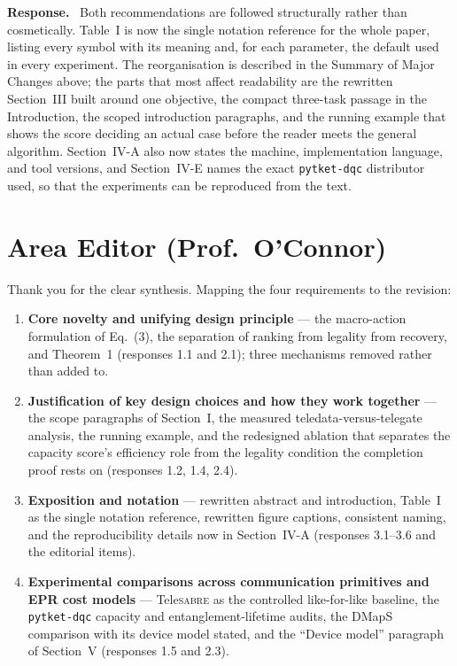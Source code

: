 \documentclass[11pt]{article}
\newcommand{\TeleSABRE}{Tele\textsc{sabre}}
\newcommand{\response}{\smallskip\noindent\textbf{Response.}\ }
\begin{document}
\response
Both recommendations are followed structurally rather than cosmetically.
Table~I is now the single notation reference for the whole paper, listing every
symbol with its meaning and, for each parameter, the default used in every
experiment. The reorganisation is described in the Summary of Major Changes
above; the parts that most affect readability are the rewritten Section~III
built around one objective, the compact three-task passage in the
Introduction, the scoped introduction paragraphs, and the running example that
shows the score deciding an actual case before the reader meets the general
algorithm. Section~IV-A also now states the machine, implementation language,
and tool versions, and Section~IV-E names the exact \texttt{pytket-dqc}
distributor used, so that the experiments can be reproduced from the text.

\section*{Area Editor (Prof.\ O'Connor)}

Thank you for the clear synthesis. Mapping the four requirements to the
revision:

\begin{enumerate}[leftmargin=*,itemsep=2pt]
\item \textbf{Core novelty and unifying design principle} --- the macro-action
formulation of Eq.~(3), the separation of ranking from legality from recovery,
and Theorem~1 (responses 1.1 and 2.1); three mechanisms removed rather than
added to.
\item \textbf{Justification of key design choices and how they work together}
--- the scope paragraphs of Section~I, the measured teledata-versus-telegate
analysis, the running example, and the redesigned ablation that separates the
capacity score's efficiency role from the legality condition the completion
proof rests on
(responses 1.2, 1.4, 2.4).
\item \textbf{Exposition and notation} --- rewritten abstract and
introduction, Table~I as the single notation reference, rewritten figure
captions, consistent naming, and the reproducibility details now in
Section~IV-A (responses 3.1--3.6 and the editorial items).
\item \textbf{Experimental comparisons across communication primitives and EPR
cost models} --- \TeleSABRE{} as the controlled like-for-like baseline, the
\texttt{pytket-dqc} capacity and entanglement-lifetime audits, the DMapS
comparison with its device model stated, and the ``Device model'' paragraph of
Section~V (responses 1.5 and 2.3).
\end{enumerate}
\end{document}
